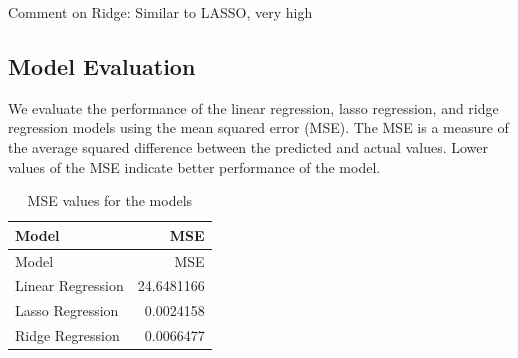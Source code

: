 \documentclass[
]{article}
\newenvironment{Shaded}{\begin{snugshade}}{\end{snugshade}}
\newcommand{\AttributeTok}[1]{\textcolor[rgb]{0.13,0.29,0.53}{#1}}
\newcommand{\DecValTok}[1]{\textcolor[rgb]{0.00,0.00,0.81}{#1}}
\newcommand{\FunctionTok}[1]{\textcolor[rgb]{0.13,0.29,0.53}{\textbf{#1}}}
\newcommand{\NormalTok}[1]{#1}
\newcommand{\OtherTok}[1]{\textcolor[rgb]{0.56,0.35,0.01}{#1}}
\newcommand{\SpecialCharTok}[1]{\textcolor[rgb]{0.81,0.36,0.00}{\textbf{#1}}}
\newcommand{\StringTok}[1]{\textcolor[rgb]{0.31,0.60,0.02}{#1}}
\begin{document}
Comment on Ridge: Similar to LASSO, very high

\subsection{Model Evaluation}\label{model-evaluation}

We evaluate the performance of the linear regression, lasso regression,
and ridge regression models using the mean squared error (MSE). The MSE
is a measure of the average squared difference between the predicted and
actual values. Lower values of the MSE indicate better performance of
the model.

\begin{Shaded}
\end{Shaded}

\begin{longtable}[]{@{}lr@{}}
\caption{MSE values for the models}\tabularnewline
\toprule\noalign{}
Model & MSE \\
\midrule\noalign{}
\endfirsthead
\toprule\noalign{}
Model & MSE \\
\midrule\noalign{}
\endhead
\bottomrule\noalign{}
\endlastfoot
Linear Regression & 24.6481166 \\
Lasso Regression & 0.0024158 \\
Ridge Regression & 0.0066477 \\
\end{longtable}
\end{document}
